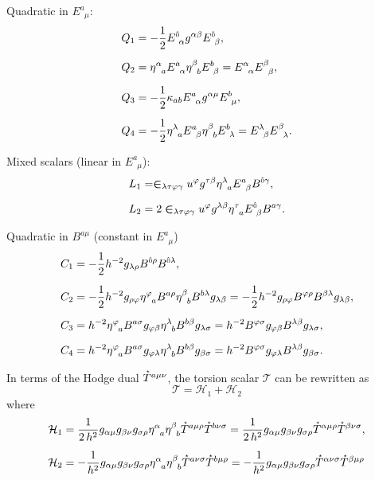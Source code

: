 \documentclass[
10pt, %
a4paper, %
oneside, %
headinclude,footinclude, %
BCOR5mm, %
]{scrartcl}
\newcommand{\mg}[1]{\kappa_{#1}}			%
\newcommand{\itetrsymbol}{\eta}
\newcommand{\itetr}[2]{\itetrsymbol^{#1}_{\phantom{#1}#2}}
\newcommand{\ET}[2]{E^{#1}_{\phantom{#1}#2}}	%
\newcommand{\BT}[2]{B^{#1#2}}	%
\newcommand{\LCsymb}{\bm{\in}}    %
\newcommand{\HDT}[1]{\accentset{\star}{T}^{#1}}
\newcommand{\indalg}[1]{\hat{\mathsmaller{#1}}}
\newcommand{\Tscal}{\mathcal{T}}		%
\newcommand{\Hscal}{\mathcal{H}}		%
\begin{document}
Quadratic in $ \ET{a}{\mu} $:
\begin{align}\label{eqn.tors.scal2.Q}
	Q_1 &= -\frac12 \ET{\indalg{0}}{\alpha} g^{\alpha\beta} \ET{\indalg{0}}{\beta},\\[2mm]
	Q_2 &= \itetr{\alpha}{a} \ET{a}{\alpha} \itetr{\beta}{b} \ET{b}{\beta} = 
	\ET{\alpha}{\alpha} \ET{\beta}{\beta},\\[2mm]
	Q_3 &=-\frac12 \mg{ab} \ET{a}{\alpha} g^{\alpha\mu}
	\ET{b}{\mu},\\[2mm]
	Q_4 &=-\frac12 \itetr{\lambda}{a} \ET{a}{\beta} \itetr{\beta}{b} \ET{b}{\lambda} = 
	\ET{\lambda}{\beta} \ET{\beta}{\lambda}.
\end{align}

Mixed scalars (linear in $ \ET{a}{\mu} $):
\begin{align}\label{eqb.ts.scal.L}
	L_1 &= \LCsymb_{\lambda\tau\varphi\gamma} u^\varphi g^{\tau\beta} \itetr{\lambda}{a} 
	\ET{a}{\beta} \BT{\indalg{0}}{\gamma},\\[2mm]
	L_2 &= 2 \LCsymb_{\lambda\tau\varphi\gamma} u^\varphi g^{\lambda\beta} \itetr{\tau}{a} 
	\ET{\indalg{0}}{\beta} \BT{a}{\gamma}.
\end{align}

Quadratic in $ \BT{a}{\mu} $ (constant in  $ \ET{a}{\mu} $)
\begin{align}\label{eqn.tors.scal.C}
	C_1 &=-\frac12 h^{-2} g_{\lambda\rho} \BT{\indalg{0}}{\rho} \BT{\indalg{0}}{\lambda},\\[2mm]
	C_2 &=-\frac12 h^{-2} g_{\rho\varphi} \itetr{\varphi}{a} \BT{a}{\rho} \itetr{\beta}{b} 
	\BT{b}{\lambda}g_{\lambda\beta} = -\frac12 h^{-2} g_{\rho\varphi} \BT{\varphi}{\rho} 
	\BT{\beta}{\lambda}g_{\lambda\beta},\\[2mm]
	C_3 &= h^{-2} \itetr{\varphi}{a} \BT{a}{\sigma} g_{\varphi\beta} \itetr{\lambda}{b} 
	\BT{b}{\beta} g_{\lambda\sigma} = h^{-2} \BT{\varphi}{\sigma} g_{\varphi\beta} 
	\BT{\lambda}{\beta} g_{\lambda\sigma},\\[2mm]
	C_4 &= h^{-2} \itetr{\varphi}{a} \BT{a}{\sigma} g_{\varphi\lambda} \itetr{\lambda}{b} 
	\BT{b}{\beta} g_{\beta\sigma} =h^{-2} \BT{\varphi}{\sigma} g_{\varphi\lambda} 
	\BT{\lambda}{\beta} g_{\beta\sigma}.
\end{align}

In terms of the Hodge dual $ \HDT{a\mu\nu} $, the torsion scalar $ \Tscal $ can be rewritten as
\begin{equation}\label{eqn.tors.scal.hodge}
	\Tscal = \Hscal_1 + \Hscal_2
\end{equation}
where 
\begin{align}\label{eqn.hodge.scal}
	\Hscal_1 &= \frac{1}{2\,h^2} g_{\alpha\mu}g_{\beta\nu}g_{\sigma\rho} 
	\itetr{\alpha}{a}\itetr{\beta}{b} \HDT{a\mu\rho}\HDT{b\nu\sigma} = 
	\frac{1}{2\,h^2} g_{\alpha\mu}g_{\beta\nu}g_{\sigma\rho} 
	\HDT{\alpha\mu\rho}\HDT{\beta\nu\sigma},
	\\[2mm]
	\Hscal_2 &=-\frac{1}{h^2} g_{\alpha\mu}g_{\beta\nu}g_{\sigma\rho} 
	\itetr{\alpha}{a}\itetr{\beta}{b} \HDT{a\nu\sigma}\HDT{b\mu\rho} = 
	-\frac{1}{h^2} g_{\alpha\mu}g_{\beta\nu}g_{\sigma\rho} 
	\HDT{\alpha\nu\sigma}\HDT{\beta\mu\rho}
\end{align}
\end{document}
